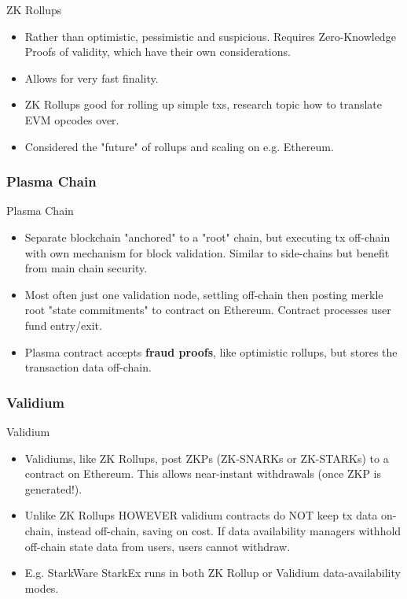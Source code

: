 \documentclass[aspectratio=169,xcolor=dvipsnames]{beamer}
\begin{document}
\begin{frame}{ZK Rollups}
    \begin{itemize}
        \item Rather than optimistic, pessimistic and suspicious. Requires Zero-Knowledge Proofs of validity, which have their own considerations.
        \item Allows for very fast finality.
        \item ZK Rollups good for rolling up simple txs, research topic how to translate EVM opcodes over.
        \item Considered the "future" of rollups and scaling on e.g. Ethereum.
    \end{itemize}
\end{frame}
\subsubsection{Plasma Chain}
\begin{frame}{Plasma Chain}
\begin{itemize}
    \item Separate blockchain "anchored" to a "root" chain, but executing tx off-chain with own mechanism for block validation. Similar to side-chains but benefit from main chain security.
    \item Most often just one validation node, settling off-chain then posting merkle root "state commitments" to contract on Ethereum. Contract processes user fund entry/exit.
    \item Plasma contract accepts \textbf{fraud proofs}, like optimistic rollups, but stores the transaction data off-chain.
\end{itemize}
\end{frame}
\subsubsection{Validium}
\begin{frame}{Validium}
\begin{itemize}
    \item Validiums, like ZK Rollups, post ZKPs (ZK-SNARKs or ZK-STARKs) to a contract on Ethereum. This allows near-instant withdrawals (once ZKP is generated!).
    \item Unlike ZK Rollups HOWEVER validium contracts do NOT keep tx data on-chain, instead off-chain, saving on cost. If data availability managers withhold off-chain state data from users, users cannot withdraw.
    \item E.g. StarkWare StarkEx runs in both ZK Rollup or Validium data-availability modes.
\end{itemize}
\end{frame}
\end{document}
